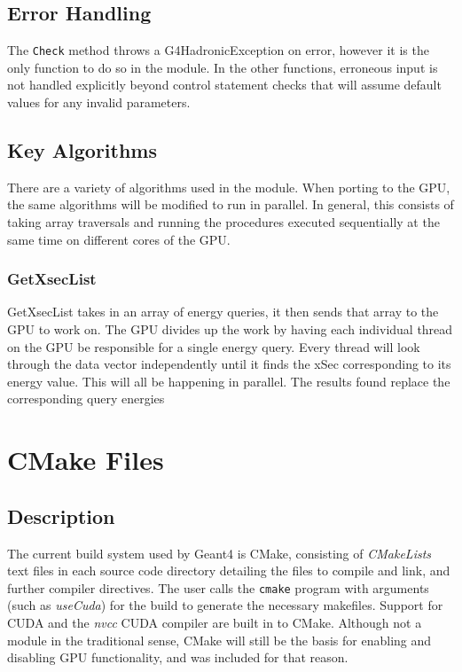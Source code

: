 \documentclass[12pt]{article}
\begin{document}
\subsection{Error Handling}
The \texttt{Check} method throws a G4HadronicException on error, however it is the only function to do so in the module. In the other functions, erroneous input is not handled explicitly beyond control statement checks that will assume default values for any invalid parameters.

\subsection{Key Algorithms}
There are a variety of algorithms used in the module. When porting to the GPU, the same algorithms will be modified to run in parallel. In general, this consists of taking array traversals and running the procedures executed sequentially at the same time on different cores of the GPU. 

\subsubsection{GetXsecList}
GetXsecList takes in an array of energy queries, it then sends that array to the GPU to work on. The GPU divides up the work by having each individual thread on the GPU be responsible for a single energy query. Every thread will look through the data vector independently until it finds the xSec corresponding to its energy value. This will all be happening in parallel. The results found replace the corresponding query energies  



\section{CMake Files}
\subsection{Description}\label{Sec_CMakeDesc}
The current build system used by Geant4 is CMake, consisting of \emph{CMakeLists} text files in each source code directory detailing the files to compile and link, and further compiler directives. The user calls the \texttt{cmake} program with arguments (such as \emph{useCuda}) for the build to generate the necessary makefiles. Support for CUDA and the \emph{nvcc} CUDA compiler are built in to CMake. Although not a module in the traditional sense, CMake will still be the basis for enabling and disabling GPU functionality, and was included for that reason.
\end{document}
